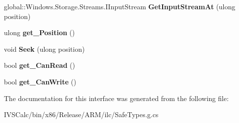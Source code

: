\begin{DoxyCompactItemize}
global\+::\+Windows.\+Storage.\+Streams.\+I\+Input\+Stream {\bfseries Get\+Input\+Stream\+At} (ulong position)
\item 
\mbox{\label{interface_windows_1_1_storage_1_1_streams_1_1_i_random_access_stream_aac0ed113bee77668c3882dd6d533c50e}} 
ulong {\bfseries get\+\_\+\+Position} ()
\item 
\mbox{\label{interface_windows_1_1_storage_1_1_streams_1_1_i_random_access_stream_a85c3af465abf7d76b4e63d17a6822fb0}} 
void {\bfseries Seek} (ulong position)
\item 
\mbox{\label{interface_windows_1_1_storage_1_1_streams_1_1_i_random_access_stream_ae4d5064fd211749208909f7f6fe63102}} 
bool {\bfseries get\+\_\+\+Can\+Read} ()
\item 
\mbox{\label{interface_windows_1_1_storage_1_1_streams_1_1_i_random_access_stream_a4794da7c24985d3c5fd5660548461faf}} 
bool {\bfseries get\+\_\+\+Can\+Write} ()
\end{DoxyCompactItemize}


The documentation for this interface was generated from the following file\+:\begin{DoxyCompactItemize}
\item 
I\+V\+S\+Calc/bin/x86/\+Release/\+A\+R\+M/ilc/Safe\+Types.\+g.\+cs\end{DoxyCompactItemize}
